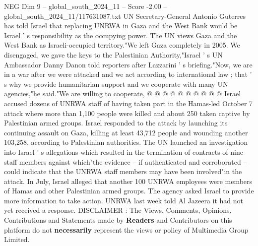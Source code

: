\begin{textsample}{NEG Dim 9 – global\_south\_2024\_11 – Score -2.00 – global\_south\_2024\_11/117631087.txt}
UN Secretary-General Antonio Guterres has told Israel that replacing UNRWA in Gaza and the West Bank would be Israel ' s responsibility as the occupying power.
The UN views Gaza and the West Bank as Israeli-occupied territory."We left Gaza completely in 2005.
We disengaged, we gave the keys to the Palestinian Authority,"Israel ' s UN Ambassador Danny Danon told reporters after Lazzarini ' s briefing."Now, we are in a war after we were attacked and we act according to international law ; that ' s why we provide humanitarian support and we cooperate with many UN agencies,"he said."We are willing to cooperate, @ @ @ @ @ @ @ @ @ @ Israel accused dozens of UNRWA staff of having taken part in the Hamas-led October 7 attack where more than 1,100 people were killed and about 250 taken captive by Palestinian armed groups.
Israel responded to the attack by launching its continuing assault on Gaza, killing at least 43,712 people and wounding another 103,258, according to Palestinian authorities.
The UN launched an investigation into Israel ' s allegations which resulted in the termination of contracts of nine staff members against which"the evidence -- if authenticated and corroborated -- could indicate that the UNRWA staff members may have been involved"in the attack.
In July, Israel alleged that another 100 UNRWA employees were members of Hamas and other Palestinian armed groups.
The agency asked Israel to provide more information to take action.
UNRWA last week told Al Jazeera it had not yet received a response.
DISCLAIMER : The Views, Comments, Opinions, Contributions and Statements made by \textbf{Readers} and Contributors on this platform do not \textbf{necessarily} represent the views or policy of Multimedia Group Limited.

\end{textsample}
